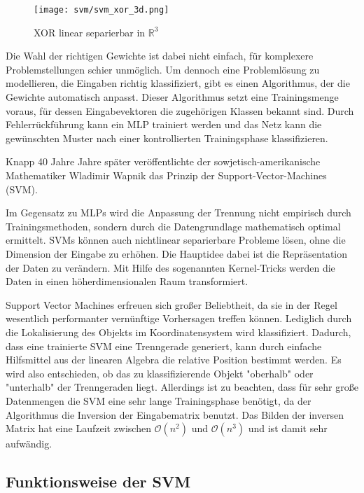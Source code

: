 \begin{figure}[htbp] \centering
    \texttt{[image: svm/svm\_xor\_3d.png]}
    \caption{XOR linear separierbar in $\mathbb{R}^3$}
    \label{fig:perceptron_xor3d}
\end{figure}

Die Wahl der richtigen Gewichte ist dabei nicht einfach, für komplexere Problemstellungen schier unmöglich. 
Um dennoch eine Problemlösung zu modellieren, die Eingaben richtig klassifiziert, gibt es einen Algorithmus, der die Gewichte automatisch anpasst.
Dieser Algorithmus setzt eine Trainingsmenge voraus, für dessen Eingabevektoren die zugehörigen Klassen bekannt sind. 
Durch Fehlerrückführung kann ein \ac{MLP} trainiert werden und das Netz kann die gewünschten Muster nach einer kontrollierten Trainingsphase klassifizieren.

Knapp 40 Jahre Jahre später veröffentlichte der sowjetisch-amerikanische Mathematiker Wladimir Wapnik \cite{Vapnik} das Prinzip der Support-Vector-Machines (\ac{SVM}).

Im Gegensatz zu \ac{MLP}s wird die Anpassung der Trennung nicht empirisch durch Trainingsmethoden, sondern durch die Datengrundlage mathematisch optimal ermittelt. 
SVMs können auch nichtlinear separierbare Probleme lösen, ohne die Dimension der Eingabe zu erhöhen. 
Die Hauptidee dabei ist die Repräsentation der Daten zu verändern. 
Mit Hilfe des sogenannten Kernel-Tricks werden die Daten in einen höherdimensionalen Raum transformiert. 

Support Vector Machines erfreuen sich großer Beliebtheit, da sie in der Regel wesentlich performanter vernünftige Vorhersagen treffen können. Lediglich durch die Lokalisierung des Objekts im Koordinatensystem wird klassifiziert. Dadurch, dass eine trainierte SVM eine Trenngerade generiert, kann durch einfache Hilfsmittel aus der linearen Algebra die relative Position bestimmt werden. Es wird also entschieden, ob das zu klassifizierende Objekt "{}oberhalb"{} oder "{}unterhalb"{} der Trenngeraden liegt. Allerdings ist zu beachten, dass für sehr große Datenmengen die \ac{SVM} eine sehr lange Trainingsphase benötigt, da der Algorithmus die Inversion der Eingabematrix benutzt. Das Bilden der inversen Matrix hat eine Laufzeit zwischen $\mathcal O(n^2)$ und $\mathcal O(n^3)$ und ist damit sehr aufwändig.


\subsection{Funktionsweise der SVM}

